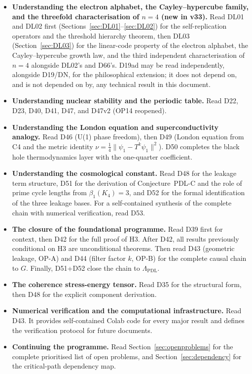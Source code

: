 \documentclass[11pt,a4paper]{article}
\theoremstyle{plain}
\theoremstyle{definition}
\theoremstyle{remark}
\begin{document}
\begin{itemize}
\item \textbf{Understanding the electron alphabet, the Cayley--hypercube family, and the threefold characterisation of $n=4$ (new in v33).} Read DL01 and DL02 first (Sections~\ref{sec:DL01}--\ref{sec:DL02}) for the self-replication operators and the threshold hierarchy theorem, then DL03 (Section~\ref{sec:DL03}) for the linear-code property of the electron alphabet, the Cayley--hypercube growth law, and the third independent characterisation of $n=4$ alongside DL02's and D66's. D19ad may be read independently, alongside D19/DN, for the philosophical extension; it does not depend on, and is not depended on by, any technical result in this document.
\item \textbf{Understanding nuclear stability and the periodic table.} Read D22, D23, D40, D41, D47, and D47v2 (OP14 reopened).
\item \textbf{Understanding the London equation and superconductivity analogy.} Read D46 (U(1) phase freedom), then D49 (London equation from C4 and the metric identity $\nu = \tfrac{1}{4}\|\psi_1 - T^k\psi_1\|^2$). D50 completes the black hole thermodynamics layer with the one-quarter coefficient.
\item \textbf{Understanding the cosmological constant.} Read D48 for the leakage term structure, D51 for the derivation of Conjecture~PDL-C and the role of prime cycle lengths from $\beta_1(K_4)=3$, and D52 for the formal identification of the three leakage bases. For a self-contained synthesis of the complete chain with numerical verification, read D53.
\item \textbf{The closure of the foundational programme.} Read D39 first for context, then D42 for the full proof of H3. After D42, all results previously conditional on H3 are unconditional theorems. Then read D43 (geometric leakage, OP-A) and D44 (filter factor $k$, OP-B) for the complete causal chain to $G$. Finally, D51+D52 close the chain to $\Lambda_{\mathrm{PDL}}$.
\item \textbf{The coherence stress-energy tensor.} Read D35 for the structural form, then D48 for the explicit component derivation.
\item \textbf{Numerical verification and the computational infrastructure.} Read D43. It provides self-contained Colab code for every major result and defines the verification protocol for future documents.
\item \textbf{Continuing the programme.} Read Section~\ref{sec:openproblems} for the complete prioritised list of open problems, and Section~\ref{sec:dependency} for the critical-path dependency map.
\end{itemize}
\end{document}
